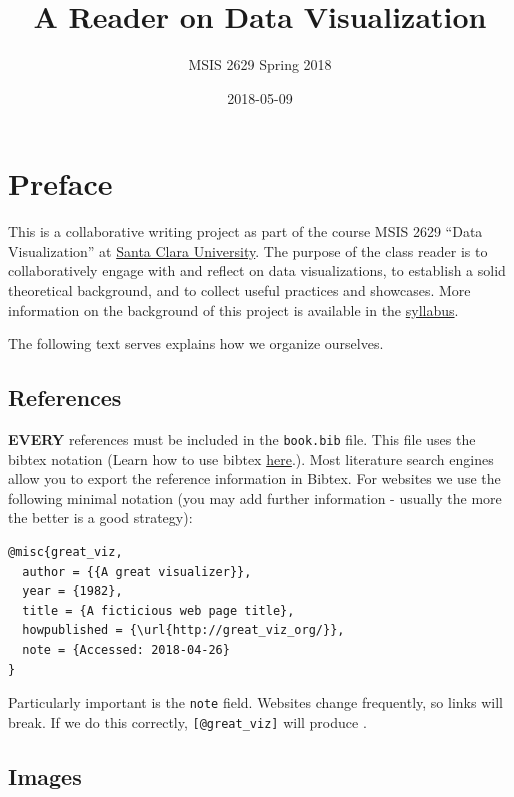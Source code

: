 \documentclass[]{book}
\title{A Reader on Data Visualization}
\author{MSIS 2629 Spring 2018}
\date{2018-05-09}
\theoremstyle{definition}
\theoremstyle{definition}
\theoremstyle{definition}
\theoremstyle{remark}
\begin{document}
\maketitle

{
\setcounter{tocdepth}{1}
\tableofcontents
}
\chapter{Preface}\label{preface}

This is a collaborative writing project as part of the course MSIS 2629
``Data Visualization'' at \href{http://www.scu.edu}{Santa Clara
University}. The purpose of the class reader is to collaboratively
engage with and reflect on data visualizations, to establish a solid
theoretical background, and to collect useful practices and showcases.
More information on the background of this project is available in the
\href{https://mschermann.github.io/msis2629spring2018}{syllabus}.

The following text serves explains how we organize ourselves.

\section{References}\label{references}

\textbf{EVERY} references must be included in the \texttt{book.bib}
file. This file uses the bibtex notation (Learn how to use bibtex
\href{http://www.bibtex.org/Using/}{here}.). Most literature search
engines allow you to export the reference information in Bibtex. For
websites we use the following minimal notation (you may add further
information - usually the more the better is a good strategy):

\begin{verbatim}
@misc{great_viz,
  author = {{A great visualizer}},
  year = {1982},
  title = {A ficticious web page title},
  howpublished = {\url{http://great_viz_org/}},
  note = {Accessed: 2018-04-26}
}
\end{verbatim}

Particularly important is the \texttt{note} field. Websites change
frequently, so links will break. If we do this correctly,
\texttt{{[}@great\_viz{]}} will produce \citep{great_viz}.

\section{Images}\label{images}
\end{document}

